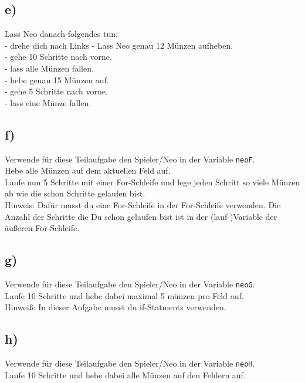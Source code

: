\subsection*{e)}
Lass Neo danach folgendes tun:\\
- drehe dich nach Links
- Lass Neo genau 12 Münzen aufheben. \\
- gehe 10 Schritte nach vorne.\\
- lass alle Münzen fallen.\\
- hebe genau 15 Münzen auf.\\
- gehe 5 Schritte nach vorne.\\
- lass eine Münze fallen.

\subsection*{f)}
Verwende für diese Teilaufgabe den Spieler/Neo in der Variable \lstinline{neoF}.\\
Hebe alle Münzen auf dem aktuellen Feld auf. \\
Laufe nun 5 Schritte mit einer For-Schleife und lege jeden Schritt so viele Münzen ab wie die schon Schritte gelaufen bist. \\
Hinweis: Dafür musst du eine For-Schleife in der For-Schleife verwenden. Die Anzahl der Schritte die Du schon gelaufen bist ist in der (lauf-)Variable der äußeren For-Schleife.


\subsection*{g)}
Verwende für diese Teilaufgabe den Spieler/Neo in der Variable \lstinline{neoG}.\\
 Laufe 10 Schritte und hebe dabei maximal 5 münzen pro Feld auf.\\
Hinweiß: In dieser Aufgabe musst du if-Statments verwenden.

\subsection*{h)}
Verwende für diese Teilaufgabe den Spieler/Neo in der Variable \lstinline{neoH}.\\
Laufe 10 Schritte und hebe dabei alle Münzen auf den Feldern auf.
\newpage
